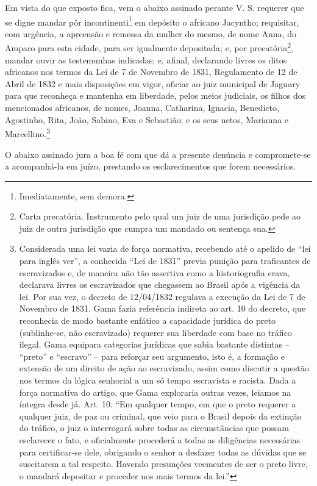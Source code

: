 Em vista do que exposto fica, vem o abaixo assinado perante V. S.
requerer que se digne mandar pôr incontinenti\footnote{Imediatamente,
  sem demora.} em depósito o africano Jacyntho; requisitar, com
urgência, a apreensão e remessa da mulher do mesmo, de nome Anna, do
Amparo para esta cidade, para ser igualmente depositada; e, por
precatória\footnote{Carta precatória. Instrumento pelo qual um juiz de
  uma jurisdição pede ao juiz de outra jurisdição que cumpra um mandado
  ou sentença sua.}, mandar ouvir as testemunhas indicadas; e, afinal,
declarando livres os ditos africanos nos termos da Lei de 7 de Novembro
de 1831, Regulamento de 12 de Abril de 1832 e mais disposições em vigor,
oficiar ao juiz municipal de Jaguary para que reconheça e mantenha em
liberdade, pelos meios judiciais, os filhos dos mencionados africanos,
de nomes, Joanna, Catharina, Ignacia, Benedicto, Agostinho, Rita, João,
Sabino, Eva e Sebastião; e os seus netos, Marianna e
Marcellino.\footnote{Considerada uma lei vazia de força normativa,
  recebendo até o apelido de ``lei para inglês ver'', a conhecida ``Lei de
  1831'' previa punição para traficantes de escravizados e, de maneira
  não tão assertiva como a historiografia crava, declarava livres os
  escravizados que chegassem ao Brasil após a vigência da lei. Por sua
  vez, o decreto de 12/04/1832 regulava a execução da Lei de 7 de
  Novembro de 1831. Gama fazia referência indireta ao art. 10 do
  decreto, que reconhecia de modo bastante enfático a capacidade
  jurídica do preto (sublinhe-se, não escravizado) requerer sua
  liberdade com base no tráfico ilegal. Gama equipara categorias
  jurídicas que sabia bastante distintas -- ``preto'' e ``escravo'' -- para
  reforçar seu argumento, isto é, a formação e extensão de um direito de
  ação ao escravizado, assim como discutir a questão nos termos da
  lógica senhorial a um só tempo escravista e racista. Dada a força
  normativa do artigo, que Gama exploraria outras vezes, leiamos na
  íntegra desde já. Art. 10. ``Em qualquer tempo, em que o preto requerer
  a qualquer juiz, de paz ou criminal, que veio para o Brasil depois da
  extinção do tráfico, o juiz o interrogará sobre todas as
  circunstâncias que possam esclarecer o fato, e oficialmente procederá
  a todas as diligências necessárias para certificar-se dele, obrigando
  o senhor a desfazer todas as dúvidas que se suscitarem a tal respeito.
  Havendo presunções veementes de ser o preto livre, o mandará depositar
  e proceder nos mais termos da lei.''}

O abaixo assinado jura a boa fé com que dá a presente denúncia e
compromete-se a acompanhá-la em juízo, prestando os esclarecimentos que
forem necessários.


